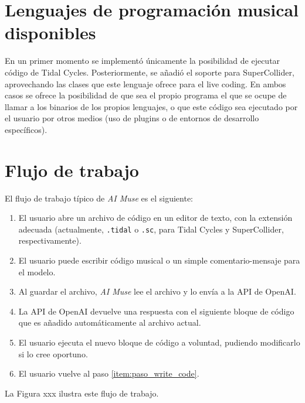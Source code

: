 
\section{Lenguajes de programación musical disponibles}

En un primer momento se implementó únicamente la posibilidad de ejecutar código de Tidal Cycles. Posteriormente, se añadió el soporte para SuperCollider, aprovechando las clases que este lenguaje ofrece para el live coding. En ambos casos se ofrece la posibilidad de que sea el propio programa el que se ocupe de llamar a los binarios de los propios lenguajes, o que este código sea ejecutado por el usuario por otros medios (uso de plugins o de entornos de desarrollo específicos).


\section{Flujo de trabajo}

El flujo de trabajo típico de \emph{AI Muse} es el siguiente:

\begin{enumerate}
    \item El usuario abre un archivo de código en un editor de texto, con la extensión adecuada (actualmente, \texttt{.tidal} o \texttt{.sc}, para Tidal Cycles y SuperCollider, respectivamente).
    \item \label{item:paso_write_code} El usuario puede escribir código musical o un simple comentario-mensaje para el modelo.
    \item Al guardar el archivo, \emph{AI Muse} lee el archivo y lo envía a la API de OpenAI.
    \item La API de OpenAI devuelve una respuesta con el siguiente bloque de código que es añadido automáticamente al archivo actual.
    \item El usuario ejecuta el nuevo bloque de código a voluntad, pudiendo modificarlo si lo cree oportuno.
    \item El usuario vuelve al paso \ref{item:paso_write_code}.
\end{enumerate}

La Figura xxx ilustra este flujo de trabajo.

